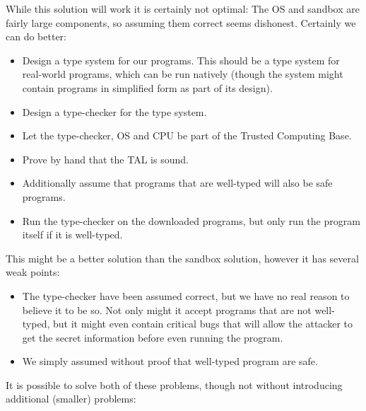 While this solution will work it is certainly not optimal: The OS and sandbox
are fairly large components, so assuming them correct seems dishonest. Certainly
we can do better:

\begin{itemize}
\item Design a type system for our programs. This should be a type system for
  real-world programs, which can be run natively (though the system might
  contain programs in simplified form as part of its design).
\item Design a type-checker for the type system.
\item Let the type-checker, OS and CPU be part of the Trusted Computing Base.
\item Prove by hand that the TAL is sound.
\item Additionally assume that programs that are well-typed will also be safe
  programs.
\item Run the type-checker on the downloaded programs, but only run the program
  itself if it is well-typed.
\end{itemize}

This might be a better solution than the sandbox solution, however it has
several weak points:

\begin{itemize}
\item The type-checker have been assumed correct, but we have no real reason to
  believe it to be so. Not only might it accept programs that are not
  well-typed, but it might even contain critical bugs that will allow the
  attacker to get the secret information before even running the program.
\item We simply assumed without proof that well-typed program are safe.
\end{itemize}

It is possible to solve both of these problems, though not without introducing
additional (smaller) problems:


